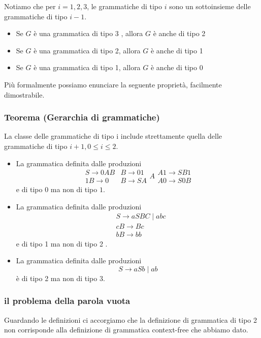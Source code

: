 Notiamo che per $i=1,2,3$, le grammatiche di tipo $i$ sono un sottoinsieme delle grammatiche di tipo $i-1$.
\begin{itemize}
    \item Se $G$ è una grammatica di tipo 3 , allora $G$ è anche di tipo 2
    \item Se $G$ è una grammatica di tipo 2, allora $G$ è anche di tipo 1
    \item Se $G$ è una grammatica di tipo 1, allora $G$ è anche di tipo 0
\end{itemize}
Più formalmente possiamo enunciare la seguente proprietà, facilmente dimostrabile.

\subsubsection{Teorema (Gerarchia di grammatiche)}
La classe delle grammatiche di tipo i include strettamente quella delle grammatiche di tipo $i + 1, 0 \leq i \leq 2$.
\begin{itemize}
    \item La grammatica definita dalle produzioni
$$
\begin{array}{rl}
S \rightarrow 0 A B & B \rightarrow 01 \\
1 B \rightarrow 0 & B \rightarrow S A
\end{array} A \begin{gathered}
A 1 \rightarrow S B 1 \\
A 0 \rightarrow S 0 B
\end{gathered}
$$
e di tipo 0 ma non di tipo $1 .$
    \item  La grammatica definita dalle produzioni
$$
\begin{aligned}
&S \rightarrow a S B C \mid a b c \\
&c B \rightarrow B c \\
&b B \rightarrow b b
\end{aligned}
$$
e di tipo 1 ma non di tipo 2 .
    \item  La grammatica definita dalle produzioni
$$
S \rightarrow a S b \mid a b
$$
è di tipo 2 ma non di tipo $3 .$
\end{itemize}

\subsubsection{il problema della parola vuota}
Guardando le definizioni ci accorgiamo che la definizione di grammatica di tipo 2 non corrisponde alla definizione di grammatica context-free che abbiamo dato.

